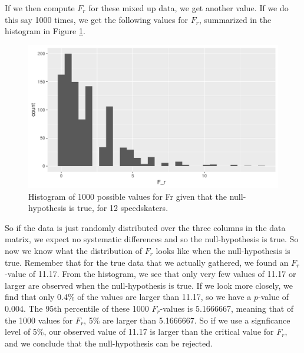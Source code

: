 \documentclass[]{report}\usepackage[]{graphicx}\usepackage[]{color}
\makeatletter
\def\maxwidth{ %
  \ifdim\Gin@nat@width>\linewidth
    \linewidth
  \else
    \Gin@nat@width
  \fi
}
\newenvironment{knitrout}{}{} %
\makeatother
\begin{document}
If we then compute $F_r$ for these mixed up data, we get another value. If we do this say 1000 times, we get the following values for $F_r$, summarized in the  histogram in Figure \ref{fig:nonparmixed_36}.


\begin{knitrout}
\color{fgcolor}\begin{figure}

{\centering \includegraphics[width=\maxwidth]{figure/nonparmixed_36-1} 

}

\caption[Histogram of 1000 possible values for Fr given that the null-hypothesis is true, for 12 speedskaters]{Histogram of 1000 possible values for Fr given that the null-hypothesis is true, for 12 speedskaters.}\label{fig:nonparmixed_36}
\end{figure}


\end{knitrout}

So if the data is just randomly distributed over the three columns in the data matrix, we expect no systematic differences and so the null-hypothesis is true. So now we know what the distribution of $F_r$ looks like when the null-hypothesis is true. Remember that for the true data that we actually gathered, we found an $F_r$-value of 11.17. From the histogram, we see that only very few values of 11.17 or larger are observed when the null-hypothesis is true. If we look more closely, we find that only 0.4\% of the values are larger than 11.17, so we have a $p$-value of 0.004. The 95th percentile of these 1000 $F_r$-values is 5.1666667, meaning that of the 1000 values for $F_r$, 5\% are larger than 5.1666667. So if we use a signficance level of 5\%, our observed value of 11.17 is larger than the critical value for $F_r$, and we conclude that the null-hypothesis can be rejected.
\end{document}
